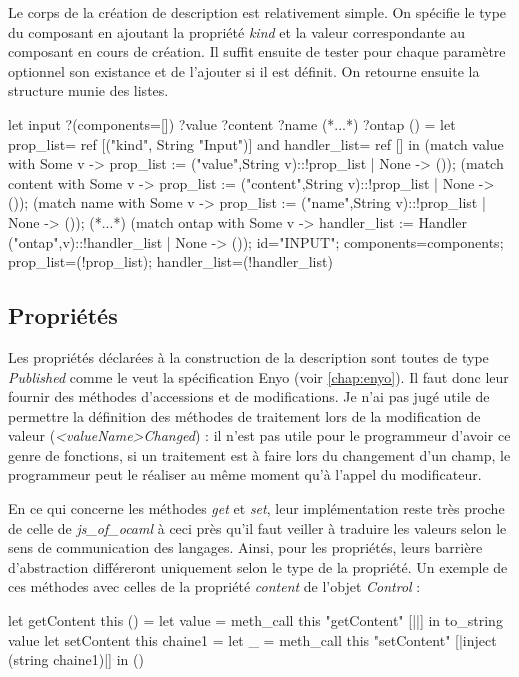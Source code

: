 \documentclass[11pt,a4paper]{report}
\begin{document}
Le corps de la création de description est relativement simple.
On spécifie le type du composant en ajoutant la propriété \emph{kind} et la valeur
correspondante au composant en cours de création.
Il suffit ensuite de tester pour chaque paramètre optionnel son existance et de l'ajouter 
si il est définit. On retourne ensuite la structure munie des listes.
\begin{OCaml}
let input
	?(components=[])
	?value
        ?content
	?name
        (*...*)
	?ontap
	() =
   let prop_list= ref [("kind", String "Input")]
   and handler_list= ref [] in
   (match value with 
       Some v -> 
         prop_list := ("value",String v)::!prop_list 
     | None -> ());
   (match content with 
       Some v -> 
         prop_list := ("content",String v)::!prop_list 
     | None -> ());
  (match name with 
       Some v -> 
         prop_list := ("name",String v)::!prop_list
     | None -> ());
  (*...*)
  (match ontap with 
       Some v -> 
         handler_list := Handler ("ontap",v)::!handler_list 
     | None -> ());
  {id="INPUT"; components=components;
  prop_list=(!prop_list); handler_list=(!handler_list)}
\end{OCaml}

\subsection{Propriétés}

Les propriétés déclarées à la construction de la description sont toutes de type \emph{Published}
comme le veut la spécification Enyo (voir \ref{chap:enyo}). Il faut donc leur fournir
des méthodes d'accessions et de modifications. Je n'ai pas jugé utile de permettre la définition
des méthodes de traitement lors de la modification de valeur (\emph{<valueName>Changed}) : 
il n'est pas utile pour le programmeur d'avoir ce genre de fonctions, si un traitement est à faire
lors du changement d'un champ, le programmeur peut le réaliser au même moment qu'à l'appel du
modificateur.

En ce qui concerne les méthodes \emph{get} et \emph{set}, leur implémentation reste très proche
de celle de \emph{js\_of\_ocaml} à ceci près qu'il faut veiller à traduire les valeurs selon le
sens de communication des langages.
Ainsi, pour les propriétés, leurs barrière d'abstraction différeront uniquement selon le type 
de la propriété. Un exemple de ces méthodes avec celles de la propriété \emph{content} 
de l'objet \emph{Control} :

\begin{OCaml}
  let getContent this () =
	let value = meth_call this "getContent" [||] in
		to_string value
  let setContent this chaine1 =
	let _ = meth_call this "setContent" [|inject (string chaine1)|] in
		()
\end{OCaml}
\end{document}
